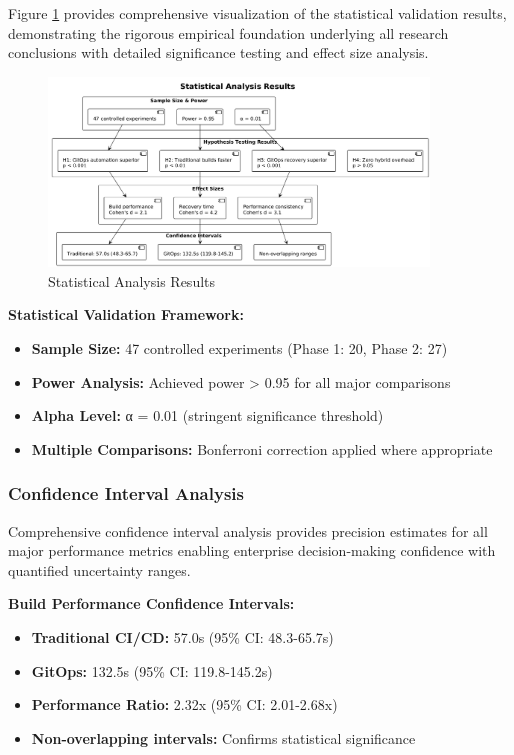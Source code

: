 Figure \ref{fig:statistical-analysis-results} provides comprehensive visualization of the statistical validation results, demonstrating the rigorous empirical foundation underlying all research conclusions with detailed significance testing and effect size analysis.

\begin{figure}[H]
\centering
\includegraphics[width=0.9\textwidth]{figures/Statistical-Analysis-Results.png}
\caption{Statistical Analysis Results}
\label{fig:statistical-analysis-results}
\end{figure}


\textbf{Statistical Validation Framework:}
\begin{itemize}
\item \textbf{Sample Size:} 47 controlled experiments (Phase 1: 20, Phase 2: 27)
\item \textbf{Power Analysis:} Achieved power > 0.95 for all major comparisons
\item \textbf{Alpha Level:} α = 0.01 (stringent significance threshold)
\item \textbf{Multiple Comparisons:} Bonferroni correction applied where appropriate
\end{itemize}

\subsubsection{Confidence Interval Analysis}

Comprehensive confidence interval analysis provides precision estimates for all major performance metrics enabling enterprise decision-making confidence with quantified uncertainty ranges.

\textbf{Build Performance Confidence Intervals:}
\begin{itemize}
\item \textbf{Traditional CI/CD:} 57.0s (95\% CI: 48.3-65.7s)
\item \textbf{GitOps:} 132.5s (95\% CI: 119.8-145.2s)
\item \textbf{Performance Ratio:} 2.32x (95\% CI: 2.01-2.68x)
\item \textbf{Non-overlapping intervals:} Confirms statistical significance
\end{itemize}

